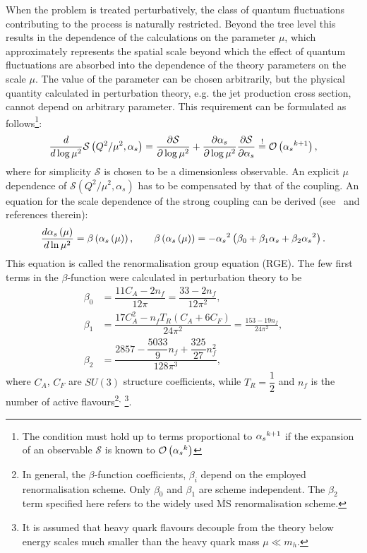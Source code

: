When the problem is treated perturbatively, the class of quantum fluctuations contributing to the process is naturally restricted. Beyond the tree level this results in the dependence of the calculations on the parameter $\mu$, which approximately represents the spatial scale beyond which the effect of quantum fluctuations are absorbed into the dependence of the theory parameters on the scale $\mu$. The value of the parameter can be chosen arbitrarily, but the physical quantity calculated in perturbation theory, e.g. the jet production cross section, cannot depend on arbitrary parameter. This requirement can be formulated as follows\footnote{The condition must hold up to terms proportional to $\mbox{$\alpha_{s}$}^{k+1}$ if the expansion of an observable $\mathcal{S}$ is known to $\mathcal{O}\left(\mbox{$\alpha_{s}$}^{k}\right)$}:
\begin{equation}
 \frac{d}{d\log{\mu^2}} \mathcal{S} \left( Q^2/\mu^2, \alpha_s \right) = \frac{\partial \mathcal{S} }{\partial \log{\mu^2}} + \frac{\partial \alpha_s }{\partial \log{\mu^2}}\frac{\partial \mathcal{S} }{\partial \alpha_s} \stackrel{!}{=} \mathcal{O}\left(\mbox{$\alpha_{s}$}^{k+1}\right),
\end{equation}
where for simplicity $\mathcal{S}$ is chosen to be a dimensionless observable. An explicit $\mu$ dependence of $\mathcal{S} \left( Q^2/\mu^2, \alpha_s \right)$ has to be compensated by that of the coupling. An equation for the scale dependence of the strong coupling can be derived (see~\cite{QCDrge:2014} and references therein):
 \begin{equation}
   \frac{d\mbox{$\alpha_{s}$}\left(\mu\right)}{d\ln{\mu^2}} = \beta\left(\mbox{$\alpha_{s}$}\left(\mu\right)\right),\qquad \beta\left(\mbox{$\alpha_{s}$}\left(\mu\right)\right) = -\mbox{$\alpha_{s}$}^2\left(\beta_0 + \beta_1\mbox{$\alpha_{s}$} + \beta_2\mbox{$\alpha_{s}$}^2\right).
 \label{eq:asrunnig}
 \end{equation}
This equation is called the renormalisation group equation (RGE). The few first terms in the $\beta$-function were calculated in perturbation theory to be
\begin{align}
	\beta_0 &= \dfrac{11C_A-2n_f}{12\pi} = \dfrac{33 - 2n_f}{12\pi^2},\\
	\beta_1 &= \dfrac{17C_A^2-n_fT_R\left(C_A+6C_F\right)}{24\pi^2} = \frac{153-19n_f}{24\pi^2},\\
	\beta_2 &= \dfrac{2857-\dfrac{5033}{9}n_f+\dfrac{325}{27}n_f^2}{128\pi^3},
\end{align}
where $C_A$, $C_F$ are $SU\left(3\right)$ structure coefficients, while $T_R=\dfrac{1}{2}$ and $n_f$ is the number of active flavours\footnote{In general, the $\beta$-function coefficients, $\beta_i$ depend on the employed renormalisation scheme. Only $\beta_0$ and $\beta_1$ are scheme independent. The $\beta_2$ term specified here refers to the widely used $\overline{\mathrm{MS}}$ renormalisation scheme.}$^,$
\footnote{It is assumed that heavy quark flavours decouple from the theory below energy scales much smaller than the heavy quark mass $\mu \ll m_h$.}. 

